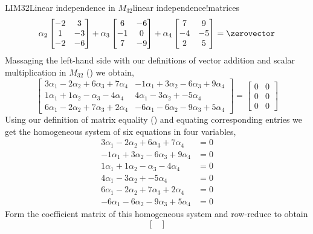 \begin{example}{LIM32}{Linear independence in $M_{32}$}{linear independence!matrices}
\begin{equation*}
\alpha_2\begin{bmatrix}
-2 & 3\\1 & -3\\-2 & -6
\end{bmatrix}+
\alpha_3\begin{bmatrix}
6 & -6\\-1 & 0\\7 & -9
\end{bmatrix}+
\alpha_4\begin{bmatrix}
7 & 9\\-4 & -5\\2 & 5
\end{bmatrix}=
\zerovector
\end{equation*}
%
Massaging the left-hand side with our definitions of vector addition and scalar multiplication in $M_{32}$ () we obtain,
%
\begin{equation*}
\begin{bmatrix}
3\alpha_1-2\alpha_2+6\alpha_3+7\alpha_4 & 
-1\alpha_1+3\alpha_2-6\alpha_3+9\alpha_4 \\ 
1\alpha_1+1\alpha_2-\alpha_3-4\alpha_4 &
4\alpha_1-3\alpha_2+            -5\alpha_4 \\ 
6\alpha_1-2\alpha_2+7\alpha_3+2\alpha_4 & 
-6\alpha_1-6\alpha_2-9\alpha_3+5\alpha_4
\end{bmatrix}
=\begin{bmatrix}
0&0\\0&0\\0&0
\end{bmatrix}
\end{equation*}
%
Using our definition of matrix equality () and equating corresponding entries we get the homogeneous system of six equations in four variables,
%
\begin{align*}
3\alpha_1-2\alpha_2+6\alpha_3+7\alpha_4&=0\\
-1\alpha_1+3\alpha_2-6\alpha_3+9\alpha_4&=0\\
1\alpha_1+1\alpha_2-\alpha_3-4\alpha_4&=0\\
4\alpha_1-3\alpha_2+            -5\alpha_4&=0\\
6\alpha_1-2\alpha_2+7\alpha_3+2\alpha_4&=0\\ 
-6\alpha_1-6\alpha_2-9\alpha_3+5\alpha_4&=0
\end{align*}
%
Form the coefficient matrix of this homogeneous system and row-reduce to obtain 
%
\begin{equation*}
\begin{bmatrix}

\end{bmatrix}
\end{equation*}
\end{example}
